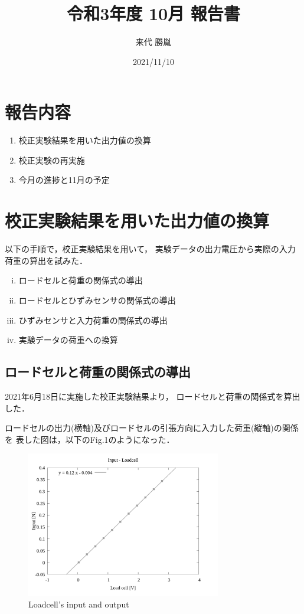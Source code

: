 \documentclass[twocolumn,a4j]{jsarticle}
\author{来代 勝胤}
\title{令和3年度 10月 報告書}
\date{2021/11/10}
\begin{document}
\columnseprule=0.1mm

\maketitle
\section*{報告内容}
\begin{enumerate}[1.]
    \item 校正実験結果を用いた出力値の換算
    \item 校正実験の再実施
    \item 今月の進捗と11月の予定
\end{enumerate}

\section{校正実験結果を用いた出力値の換算}
以下の手順で，校正実験結果を用いて，
実験データの出力電圧から実際の入力荷重の算出を試みた．
\begin{enumerate}[(i)]
    \item ロードセルと荷重の関係式の導出
    \item ロードセルとひずみセンサの関係式の導出
    \item ひずみセンサと入力荷重の関係式の導出
    \item 実験データの荷重への換算
\end{enumerate}
\subsection{ロードセルと荷重の関係式の導出}
2021年6月18日に実施した校正実験結果より，
ロードセルと荷重の関係式を算出した．\par
ロードセルの出力(横軸)及びロードセルの引張方向に入力した荷重(縦軸)の関係を
表した図は，以下のFig.1のようになった．
\begin{figure}[htbp]
    \footnotesize
    \begin{center}
        \includegraphics[width=85mm]{../images/02_force&line.png}
        \caption{Loadcell's input and output}
    \end{center}
\end{figure}
\end{document}
